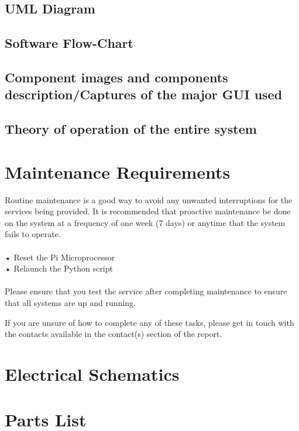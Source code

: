 \documentclass[a4paper,12pt]{article}
\begin{document}
\subsection{UML Diagram}
\subsection{Software Flow-Chart}

\subsection{Component images and components description/Captures of the major GUI used}

\subsection{Theory of operation of the entire system}

\newpage
\section{Maintenance Requirements}

Routine maintenance is a good way to avoid any unwanted interruptions for the services being provided. It is recommended that proactive maintenance be done on the system at a frequency of one week (7 days) or anytime that the system fails to operate.
\\
\\
    • Reset the Pi Microprocessor
\\
    •	Relaunch the Python script
\\
\\
Please ensure that you test the service after completing maintenance to ensure that all systems are up and running. 

If you are unsure of how to complete any of these tasks, please get in touch with the contacts available in the contact(s) section of the report.

\appendix
\section{Electrical Schematics}

\section{Parts List}
\end{document}
